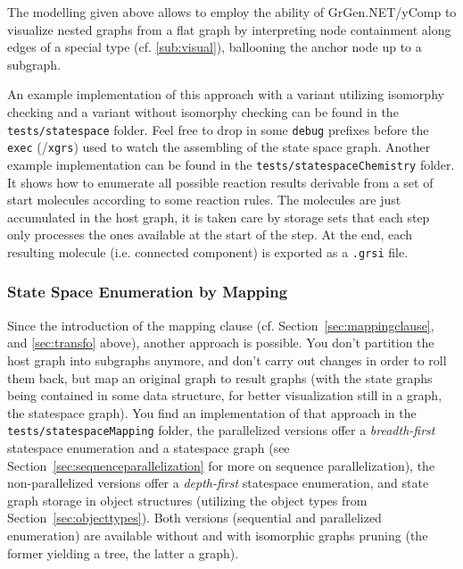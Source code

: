 The modelling given above allows to employ the ability of GrGen.NET/yComp to visualize nested graphs from a flat graph by interpreting node containment along edges of a special type (cf. \ref{sub:visual}), ballooning the anchor node up to a subgraph. 

An example implementation of this approach with a variant utilizing isomorphy checking and a variant without isomorphy checking can be found in the \texttt{tests/statespace} folder.
Feel free to drop in some \texttt{debug} prefixes before the \texttt{exec} (/\texttt{xgrs}) used to watch the assembling of the state space graph.
Another example implementation can be found in the \texttt{tests/statespaceChemistry} folder.
It shows how to enumerate all possible reaction results derivable from a set of start molecules according to some reaction rules.
The molecules are just accumulated in the host graph, it is taken care by storage sets that each step only processes the ones available at the start of the step.
At the end, each resulting molecule (i.e. connected component) is exported as a \texttt{.grsi} file.

\subsubsection*{State Space Enumeration by Mapping}

Since the introduction of the mapping clause (cf. Section~\ref{sec:mappingclause}, and \ref{sec:transfo} above), another approach is possible.
You don't partition the host graph into subgraphs anymore, and don't carry out changes in order to roll them back, but map an original graph to result graphs (with the state graphs being contained in some data structure, for better visualization still in a graph, the statespace graph).
You find an implementation of that approach in the \texttt{tests/statespaceMapping} folder, the parallelized versions offer a \emph{breadth-first} statespace enumeration and a statespace graph (see Section~\ref{sec:sequenceparallelization} for more on sequence parallelization), the non-parallelized versions offer a \emph{depth-first} statespace enumeration, and state graph storage in object structures (utilizing the object types from Section~\ref{sec:objecttypes}).
Both versions (sequential and parallelized enumeration) are available without and with isomorphic graphs pruning (the former yielding a tree, the latter a graph).

